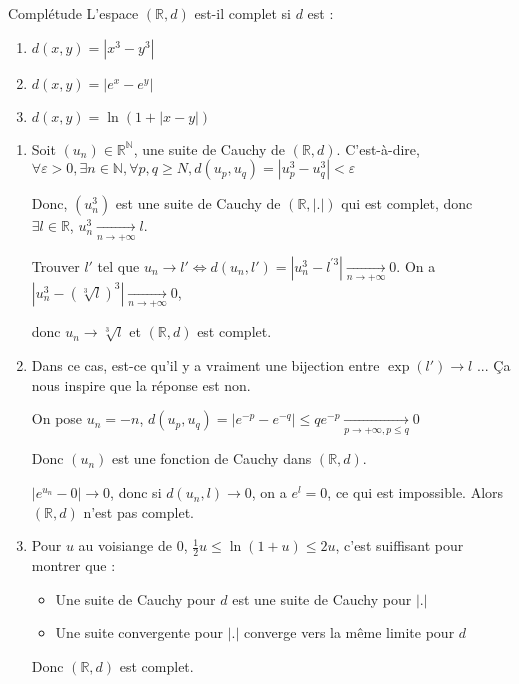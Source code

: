 \begin{question}{Complétude}{}
L'espace $(\mathbb{R},d )$  est-il complet si $d$ est :
\begin{enumerate}

    \item $d(x,y) = |x ^{3} - y ^{3} |$
    \item $d(x,y) = |e^{x} - e^{y}|$
    \item $d(x,y) = \ln (1 + | x- y | )$

\end{enumerate}
\end{question}

\begin{myproof}{}{}
\begin{enumerate}

    \item 
Soit $(u_n) \in \mathbb{R} ^{ \mathbb{N}}$, une suite de Cauchy de $(\mathbb{R}, d)$. C'est-à-dire, $\forall \varepsilon >0, \exists n \in \mathbb{N}, \forall p,q \ge N, d(u_p, u_q) = |u_p ^{3} - u_q ^{3}| < \varepsilon$

Donc, $(u_n ^{3})$ est une suite de Cauchy de $( \mathbb{R}, |.|)$ qui est complet, donc $\exists l \in \mathbb{R}$, $u_n ^{3}\underset{n \to + \infty}{\longrightarrow} l$. 

Trouver $l'$ tel que $u_n \to l' \iff d(u_n, l') = |u_n ^{3} - l ^{'3} |\underset{n \to + \infty}{\longrightarrow} 0$. On a  $|u_n ^{3} - (\sqrt[3]{l}) ^{3} |  \underset{n \to + \infty}{\longrightarrow} 0$,

donc $u_n \to \sqrt[3]{l}$ et $(\mathbb{R}, d)$ est complet.
\item  Dans ce cas, est-ce qu'il y a vraiment une bijection entre $\exp(l') \to l$ ... Ça nous inspire que la réponse est non. 

On pose $u_n = -n$, $d(u_p, u_q) = |e^{-p} - e ^{-q}| \le q e ^{-p}  \underset{p \to + \infty, p \le q}{\longrightarrow} 0$

Donc $(u_n)$ est une fonction de Cauchy dans $(\mathbb{R}, d)$. 

$|e^{u_n} - 0| \to 0$, donc si $d(u_n, l)\to 0$, on a $e ^{l} = 0$, ce qui est impossible. Alors $(\mathbb{R}, d)$ n'est pas complet.

\item Pour $u$ au voisiange de $0$, $\frac{1}{2} u \le \ln (1+ u) \le 2u$, c'est suiffisant pour montrer que :
  \begin{itemize}

      \item Une suite de Cauchy pour $d$ est une suite de Cauchy pour $|.|$
      \item Une suite convergente pour $|.|$ converge vers la même limite pour $d$
  \end{itemize}

  Donc $(\mathbb{R}, d)$ est complet.
\end{enumerate}
\end{myproof}

